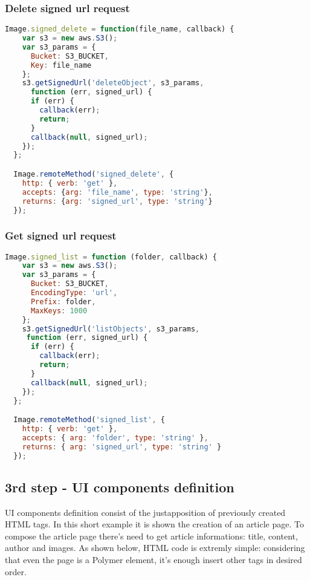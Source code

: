 \subsubsection{Delete signed url request}

\begin{lstlisting}[language=javascript]
Image.signed_delete = function(file_name, callback) {
    var s3 = new aws.S3();
    var s3_params = {
      Bucket: S3_BUCKET,
      Key: file_name
    };
    s3.getSignedUrl('deleteObject', s3_params,
      function (err, signed_url) {
      if (err) {
        callback(err);
        return;
      }
      callback(null, signed_url);
    });
  };

  Image.remoteMethod('signed_delete', {
    http: { verb: 'get' },
    accepts: {arg: 'file_name', type: 'string'},
    returns: {arg: 'signed_url', type: 'string'}
  });

\end{lstlisting}

\subsubsection{Get signed url request}

\begin{lstlisting}[language=javascript]
Image.signed_list = function (folder, callback) {
    var s3 = new aws.S3();
    var s3_params = {
      Bucket: S3_BUCKET,
      EncodingType: 'url',
      Prefix: folder,
      MaxKeys: 1000
    };
    s3.getSignedUrl('listObjects', s3_params,
     function (err, signed_url) {
      if (err) {
        callback(err);
        return;
      }
      callback(null, signed_url);
    });
  };

  Image.remoteMethod('signed_list', {
    http: { verb: 'get' },
    accepts: { arg: 'folder', type: 'string' },
    returns: { arg: 'signed_url', type: 'string' }
  });
\end{lstlisting}


\subsection{3rd step - UI components definition}


UI components definition consist of the justapposition of previously created HTML tags. In this short example it is shown the creation of an article page.
To compose the article page there's need to get article informations: title, content, author and images.
As shown below, HTML code is extremly simple: considering that even the page is a Polymer element, it's enough insert other tags in desired order. 


